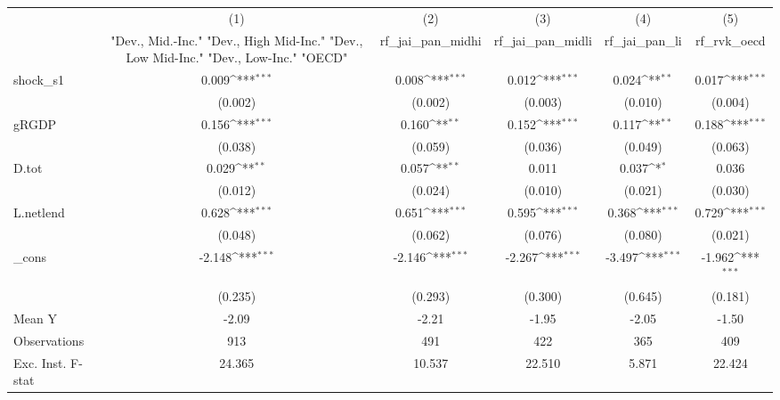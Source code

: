 {
\def\sym#1{\ifmmode^{#1}\else\(^{#1}\)\fi}
\begin{tabular}{l*{5}{c}}
\toprule
            &\multicolumn{1}{c}{(1)}&\multicolumn{1}{c}{(2)}&\multicolumn{1}{c}{(3)}&\multicolumn{1}{c}{(4)}&\multicolumn{1}{c}{(5)}\\
            &\multicolumn{1}{c}{ "Dev., Mid.-Inc." "Dev., High Mid-Inc." "Dev., Low Mid-Inc." "Dev., Low-Inc." "OECD" }&\multicolumn{1}{c}{rf\_jai\_pan\_midhi}&\multicolumn{1}{c}{rf\_jai\_pan\_midli}&\multicolumn{1}{c}{rf\_jai\_pan\_li}&\multicolumn{1}{c}{rf\_rvk\_oecd}\\
\midrule
shock\_s1    &       0.009\sym{***}&       0.008\sym{***}&       0.012\sym{***}&       0.024\sym{**} &       0.017\sym{***}\\
            &     (0.002)         &     (0.002)         &     (0.003)         &     (0.010)         &     (0.004)         \\
\addlinespace
gRGDP       &       0.156\sym{***}&       0.160\sym{**} &       0.152\sym{***}&       0.117\sym{**} &       0.188\sym{***}\\
            &     (0.038)         &     (0.059)         &     (0.036)         &     (0.049)         &     (0.063)         \\
\addlinespace
D.tot       &       0.029\sym{**} &       0.057\sym{**} &       0.011         &       0.037\sym{*}  &       0.036         \\
            &     (0.012)         &     (0.024)         &     (0.010)         &     (0.021)         &     (0.030)         \\
\addlinespace
L.netlend   &       0.628\sym{***}&       0.651\sym{***}&       0.595\sym{***}&       0.368\sym{***}&       0.729\sym{***}\\
            &     (0.048)         &     (0.062)         &     (0.076)         &     (0.080)         &     (0.021)         \\
\addlinespace
\_cons      &      -2.148\sym{***}&      -2.146\sym{***}&      -2.267\sym{***}&      -3.497\sym{***}&      -1.962\sym{***}\\
            &     (0.235)         &     (0.293)         &     (0.300)         &     (0.645)         &     (0.181)         \\
\midrule
Mean Y      &       -2.09         &       -2.21         &       -1.95         &       -2.05         &       -1.50         \\
Observations&         913         &         491         &         422         &         365         &         409         \\
Exc. Inst. F-stat&      24.365         &      10.537         &      22.510         &       5.871         &      22.424         \\
\bottomrule
\end{tabular}
}
